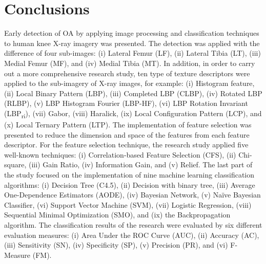 \documentclass[review]{elsarticle}
\begin{document}

\section{Conclusions}

Early detection of OA by applying image processing and classification techniques to human knee X-ray imagery was presented. The detection was applied with the difference of four sub-images: (i) Lateral Femur (LF), (ii) Lateral Tibia (LT), (iii) Medial Femur (MF), and (iv) Medial Tibia (MT). In addition, in order to carry out a more comprehensive research study, ten type of texture descriptors were applied to the sub-imagery of X-ray images, for example: (i) Histogram feature, (ii) Local Binary Pattern (LBP), (iii) Completed LBP (CLBP), (iv) Rotated LBP (RLBP), (v) LBP Histogram Fourier (LBP-HF), (vi) LBP Rotation Invariant (LBP\textsubscript{ri}), (vii) Gabor, (viii) Haralick, (ix) Local Configuration Pattern (LCP), and (x) Local Ternary Pattern (LTP). The implementation of feature selection was presented to reduce the dimension and space of the features from each feature descriptor. For the feature selection technique, the research study applied five well-known techniques: (i) Correlation-based Feature Selection (CFS), (ii) Chi-square, (iii) Gain
Ratio, (iv) Information Gain, and (v) Relief. The last part of the study focused on the implementation of nine machine learning classification algorithms: (i) Decision Tree (C4.5), (ii) Decision with binary tree, (iii) Average One-Dependence Estimators (AODE), (iv) Bayesian Network, (v) Na\"ive Bayesian Classifier, (vi) Support Vector Machine (SVM), (vii) Logistic Regression, (viii) Sequential Minimal Optimization (SMO), and (ix) the Backpropagation algorithm. The classification results of the research were evaluated by six different evaluation measures: (i) Area Under the ROC Curve (AUC), (ii) Accuracy (AC), (iii) Sensitivity (SN), (iv) Specificity (SP), (v) Precision (PR), and (vi) F-Measure (FM).
\end{document}
